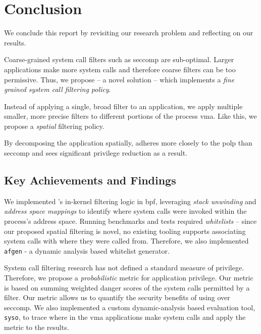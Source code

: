 \section{Conclusion}\label{sec:conclusion}


\iffalse

You need a proper conclusion chapter that will:
- recontextualise and remotivate the researhc problem tackled
- brieflly summarise your solution and its evaluation
- optionally present some of the limitations of the current prototype
- optionally include some critical reflection
- and list avenues for future works

\fi

We conclude this report by revisiting our research problem and reflecting on our
results.

Coarse-grained system call filters such as seccomp are sub-optimal.
Larger applications make more system calls and therefore coarse filters can be
too permissive. Thus, we propose \af -- a novel solution -- which implements a 
\textit{fine grained system call filtering policy}.

Instead of applying a single, broad filter to an application, we apply multiple
smaller, more precise filters to different portions of the process \ac{vma}.
Like this, we propose a \textit{spatial} filtering policy. 

By decomposing the application spatially, \af adheres more closely to the
\ac{polp} than seccomp and sees significant privilege reduction as a result.

\subsection{Key Achievements and Findings}

We implemented \af's in-kernel filtering logic in \ac{bpf}, leveraging
\textit{stack unwinding} and \textit{address space mappings} to identify where
system calls were invoked within the process's address space. Running benchmarks
and tests required \textit{whitelists} -- since our proposed spatial filtering
is novel, no existing tooling supports associating system calls with where they
were called from. Therefore, we also implemented \texttt{afgen} - a
dynamic analysis based whitelist generator.

System call filtering research has not defined a standard measure of privilege.
Therefore, we propose a \textit{probabilistic} metric for application privilege.
Our metric is based on summing weighted danger scores of the system calls
permitted by a filter. Our metric allows us to quantify the security benefits
of using \af over seccomp. We also implemented a custom dynamic-analysis based
evaluation tool, \texttt{syso}, to trace where in the \ac{vma} applications make 
system calls and apply the metric to the results.

